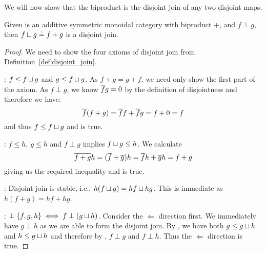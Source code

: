 We will now show that the biproduct is the disjoint join of any two disjoint maps.

\begin{lemma}\label{lem:biproduct_is_the_disjoint_join_in_cfrobx}
  Given \X is an  additive symmetric monoidal category with
biproduct $+$, and $f\perp g$, then $f\sqcup g \doteq f+g$ is a disjoint join.
\end{lemma}
\begin{proof}
  We need to show the four axioms of disjoint join from Definition~\ref{def:disjoint_join}.

   : $f \le f \sqcup g$ and $g \le f \sqcup g$.
  As $f+g = g+f$, we need only show the first part of the axiom. As $f\perp g$, we know $\overline{f}g=0$
  by the definition of disjointness and therefore we have:
  \[
    \overline{f}(f+g) = \overline{f}f + \overline{f} g = f + 0 = f
  \]
  and thus $f \le f \sqcup g$ and  is true.

  : $f \le h,\ g \le h$ and $f\perp g$ implies $f \sqcup g \le h$.  We calculate
  \[
    \overline{f+g}h = (\overline{f}+\overline{g}) h = \overline{f}h + \overline{g} h = f + g
  \]
  giving us the required inequality and  is true.

  : Disjoint join is stable, i.e., $h(f \sqcup g) = h f \sqcup h g$. This is immediate
  as $h(f+g) = hf + h g$.

  : $\perp \{f, g, h\} \iff f \perp (g\sqcup h)$. Consider the $\Longleftarrow$
  direction first. We immediately have $g\perp h$ as we are able to form the disjoint join. By
  , we have both $g \le g \sqcup h$ and $h \le g\sqcup h$ and therefore by
  , $f \perp g$ and $f\perp h$. Thus the $\Longleftarrow$ direction is true.


\end{proof}
